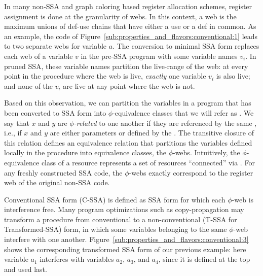 In many non-SSA and graph coloring based register allocation schemes, register assignment is done at the granularity of webs. In this context, a web is the maximum unions of def-use chains that have either a use or a def in common. As an example, the code of Figure~\ref{sub:properties_and_flavors:conventional:1} leads to two separate webs for variable $a$.
The conversion to minimal SSA form replaces each web of a variable $v$ in the pre-SSA
program with some variable names $v_i$. In pruned
SSA, these variable names partition the live-range of the web: at every point in the procedure where the web is
live, \emph{exactly} one variable $v_{i}$ is also live; and none of
the $v_{i}$ are live at any point where the web is not. 


Based on this observation, we can partition the variables in a 
program that has been converted to SSA form into $\phi$-equivalence classes that we will refer as \phiwebs.\index{\phiweb}
We say that $x$ and $y$ are \emph{$\phi$-related} to one another
if they are referenced by the same \phifun, i.e., 
if $x$ and $y$ are either parameters or defined by the \phifun. The transitive closure of this relation defines an equivalence relation that 
partitions the variables defined locally in the procedure into equivalence classes, the $\phi$-webs.
Intuitively, the $\phi$-equivalence class of a resource represents a set of resources ``connected'' via \phifuns.
For any freshly constructed SSA code, the $\phi$-webs exactly correspond to the register web of the original non-SSA code.

Conventional SSA form (C-SSA)
is defined as SSA form for which each $\phi$-web
is interference free. Many program optimizations such as copy-propagation may transform a procedure from conventional
to a non-conventional (T-SSA for Transformed-SSA) form, in which some variables belonging to
the same $\phi$-web interfere with one another. Figure~\ref{sub:properties_and_flavors:conventional:3}
shows the corresponding transformed SSA form of our previous example: here variable $a_1$ interferes with variables $a_2$, $a_3$, and $a_4$, since it is defined at the top and used last.

